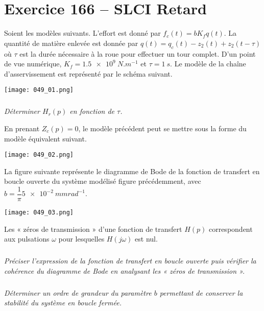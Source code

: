 \section*{Exercice 166 -- SLCI Retard}

\setcounter{exo}{0}

Soient les modèles suivants. L'effort est donné par $f_c(t)=bK_f q(t)$. 
La quantité de matière enlevée est donnée par $q(t)=q_c(t)-z_2(t)+z_2(t-\tau)$ où $\tau$ est la durée nécessaire à la roue pour effectuer un tour complet.
D’un point de vue numérique, $K_f = \SI{1.5e9}{N.m^{-1}}$ 
et $\tau = \SI{1}{s}$. Le modèle de la chaîne d’asservissement est représenté par le schéma suivant.

 
\begin{center}
\texttt{[image: 049\_01.png]}
\end{center}


\subparagraph{}\textit{Déterminer $H_r(p)$ en fonction de $\tau$.}

\ifprof
\begin{corrige}
\end{corrige}
\else
\fi

En prenant $Z_c(p)=0$, le modèle précédent peut se mettre sous la forme du modèle équivalent suivant.

\begin{center}
\texttt{[image: 049\_02.png]}
\end{center}

La figure suivante représente le diagramme de Bode de la fonction de transfert en boucle ouverte du système modélisé
figure précédemment, avec $b=\dfrac{1}{\pi}\SI{5e-2}{{mm rad}^{-1}}$. 

\begin{center}
\texttt{[image: 049\_03.png]}
\end{center}
Les « zéros de transmission » d’une fonction de transfert $H(p)$ correspondent aux pulsations $\omega$ pour lesquelles $H(j\omega)$ est nul.
\subparagraph{}\textit{Préciser l’expression de la fonction de transfert en boucle ouverte puis vérifier la
cohérence du diagramme de Bode en analysant les « zéros de transmission ».}
\ifprof
\begin{corrige}
\end{corrige}
\else
\fi



\subparagraph{}\textit{Déterminer un ordre de grandeur du paramètre $b$ permettant de conserver la stabilité du système en
boucle fermée.}
\ifprof
\begin{corrige}
\end{corrige}
\else
\fi